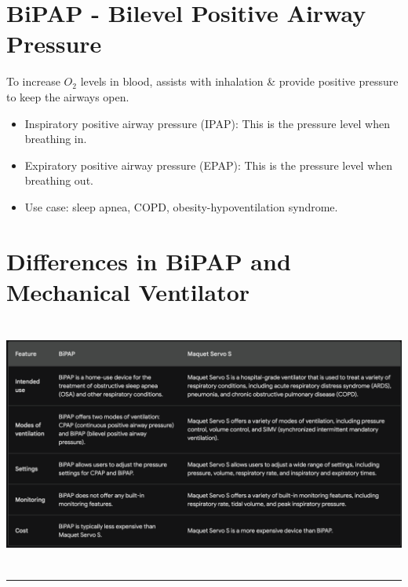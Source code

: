 \documentclass[
  11pt,
  letterpaper,
  DIV=11,
  numbers=noendperiod]{scrreprt}
\providecommand{\tightlist}{%
  \setlength{\itemsep}{0pt}\setlength{\parskip}{0pt}}\usepackage{longtable,booktabs,array}
\begin{document}
\section{BiPAP - Bilevel Positive Airway
Pressure}\label{bipap---bilevel-positive-airway-pressure}

To increase \(O_2\) levels in blood, assists with inhalation \& provide
positive pressure to keep the airways open.

\begin{itemize}
\tightlist
\item
  Inspiratory positive airway pressure (IPAP): This is the pressure
  level when breathing in.
\item
  Expiratory positive airway pressure (EPAP): This is the pressure level
  when breathing out.
\item
  Use case: sleep apnea, COPD, obesity-hypoventilation syndrome.
\end{itemize}

\section{Differences in BiPAP and Mechanical
Ventilator}\label{differences-in-bipap-and-mechanical-ventilator}

\includegraphics[width=5.5625in,height=3.22917in]{Beyond the Sterile Walls e0cff5645ec24545a8c247940fff8e84/Untitled 11.png}

\begin{center}\rule{0.5\linewidth}{0.5pt}\end{center}
\end{document}
